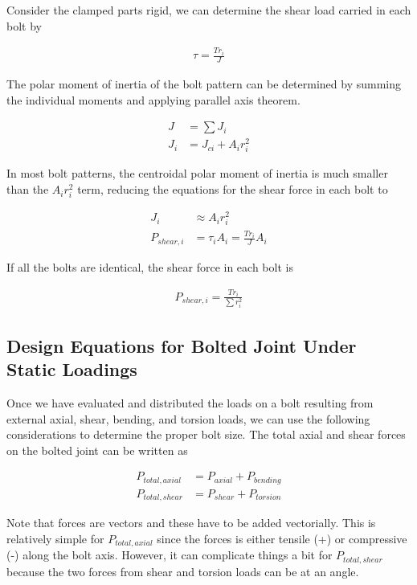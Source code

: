 \documentclass[
10pt,
a4paper,
openany,
svgnames,
]{book}
\begin{document}
Consider the clamped parts rigid, we can determine the shear load carried in each bolt by

\begin{align}
  \label{eq: bolt stress under torsion}
  \tau = \frac{Tr_i}{J} 
\end{align}

The polar moment of inertia of the bolt pattern can be determined by summing the individual moments and applying parallel axis theorem. 

\begin{align}
  J &= \sum J_i \\
  J_i &= J_{ci} + A_ir_i^2 
\end{align}

In most bolt patterns, the centroidal polar moment of inertia is much smaller than the $A_ir_i^2$ term, reducing the equations for the shear force in each bolt to

\begin{align}
  J_i &\approx A_ir_i^2 \\
  P_{shear, i} &= \tau_i A_i = \frac{T r_i}{J} A_i 
\end{align}

If all the bolts are identical, the shear force in each bolt is

\begin{align}
  \label{eq: force in bolt under torsion}
  P_{shear, i} = \frac{T r_i}{\sum r_i^2}
\end{align}

\subsection{Design Equations for Bolted Joint Under Static Loadings}

Once we have evaluated and distributed the loads on a bolt resulting from external axial, shear, bending, and torsion loads, we can use the following considerations to determine the proper bolt size. The total axial and shear forces on the bolted joint can be written as

\begin{align}
  \label{eq: total forces on bolted joint}
  P_{total, axial} &= P_{axial} + P_{bending} \\
  P_{total, shear} &= P_{shear} + P_{torsion}
\end{align}

Note that forces are vectors and these have to be added vectorially. This is relatively simple for $P_{total, axial}$ since the forces is either tensile (+) or compressive (-) along the bolt axis. However, it can complicate things a bit for $P_{total, shear}$ because the two forces from shear and torsion loads can be at an angle.
\end{document}
